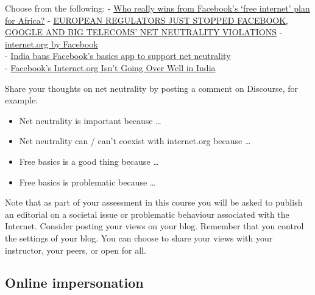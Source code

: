 \documentclass[
]{book}
\providecommand{\tightlist}{%
  \setlength{\itemsep}{0pt}\setlength{\parskip}{0pt}}
\theoremstyle{definition}
\theoremstyle{definition}
\theoremstyle{definition}
\theoremstyle{definition}
\theoremstyle{remark}
\begin{document}
\begin{reflect}
Choose from the following:
- \href{https://www.zdnet.com/article/who-really-wins-from-facebooks-free-internet-plan-for-africa/}{Who really wins from Facebook's `free internet' plan for Africa?}
- \href{https://cyberlaw.stanford.edu/blog/2022/06/european-regulators-just-stopped-facebook-google-and-big-telecoms-net-neutrality}{EUROPEAN REGULATORS JUST STOPPED FACEBOOK, GOOGLE AND BIG TELECOMS' NET NEUTRALITY VIOLATIONS}
- \href{https://en.wikipedia.org/wiki/Internet.org}{internet.org by Facebook}\\
- \href{https://www.wired.com/2016/02/facebooks-free-basics-app-is-now-banned-in-india/}{India bans Facebook's basics app to support net neutrality}\\
- \href{https://fortune.com/2016/01/22/facebook-india-internet/}{Facebook's Internet.org Isn't Going Over Well in India}

Share your thoughts on net neutrality by posting a comment on Discourse, for example:

\begin{itemize}
\tightlist
\item
  Net neutrality is important because \ldots{}\\
\item
  Net neutrality can / can't coexist with internet.org because \ldots{}\\
\item
  Free basics is a good thing because \ldots{}\\
\item
  Free basics is problematic because \ldots{}
\end{itemize}
\end{reflect}

\begin{feedback}
Note that as part of your assessment in this course you will be asked to
publish an editorial on a societal issue or problematic behaviour
associated with the Internet. Consider posting your views on your blog.
Remember that you control the settings of your blog. You can choose to
share your views with your instructor, your peers, or open for all.
\end{feedback}

\hypertarget{online-impersonation}{%
\subsection*{Online impersonation}\label{online-impersonation}}
\end{document}
